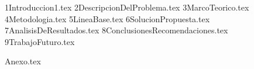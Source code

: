 \documentclass[12pt,letterpaper,oneside]{book}
\newcommand{\capitulo}[1]{{#1.tex}}
\newcommand{\apendice}[1]{{#1.tex}}
\newcommand{\anexo}[1]{{#1.tex}}
\begin{document}
\frontmatter

\clearpage
\thispagestyle{empty}

\clearpage
\thispagestyle{empty}
\tableofcontents
\thispagestyle{empty}
\clearpage

\setcounter{page}{1}
\listoffigures
{}
\clearpage
\listoftables
{}
\clearpage

\mainmatter
\capitulo{1Introduccion1}
\capitulo{2DescripcionDelProblema}
\capitulo{3MarcoTeorico}
\capitulo{4Metodologia}
\capitulo{5LineaBase}
\capitulo{6SolucionPropuesta}
\capitulo{7AnalisisDeResultados}
\capitulo{8ConclusionesRecomendaciones}
\capitulo{9TrabajoFuturo}
\backmatter


\appendix
\anexo{Anexo}
\end{document}
